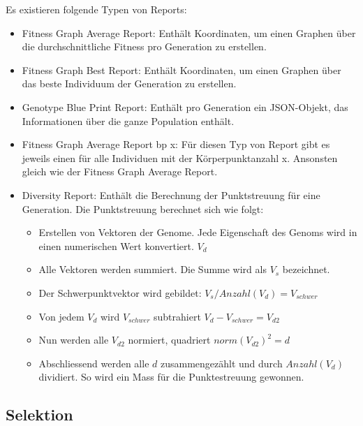       \medskip

      Es existieren folgende Typen von Reports:

      \begin{itemize}

        \item Fitness Graph Average Report: Enthält Koordinaten,
          um einen Graphen über die durchschnittliche Fitness pro Generation zu erstellen.

        \item Fitness Graph Best Report: Enthält Koordinaten,
          um einen Graphen über das beste Individuum der Generation zu erstellen.

        \item Genotype Blue Print Report: Enthält pro Generation ein \gls{JSON}-Objekt,
          das Informationen über die ganze Population enthält.

        \item Fitness Graph Average Report bp x: Für diesen Typ von Report gibt es jeweils einen für alle Individuen mit der Körperpunktanzahl x.
              Ansonsten gleich wie der Fitness Graph Average Report.

        \item Diversity Report: Enthält die Berechnung der Punktstreuung für eine Generation.
          Die Punktstreuung berechnet sich wie folgt:

        \begin{itemize}
          \item Erstellen von Vektoren der Genome. Jede Eigenschaft des Genoms wird in einen numerischen Wert konvertiert. \( V_d \)
          \item Alle Vektoren werden summiert. Die Summe wird als \(V_s\) bezeichnet.
          \item Der Schwerpunktvektor wird gebildet: \( V_s / Anzahl(V_d) = V_{schwer} \)
          \item Von jedem \(V_d\) wird \(V_{schwer}\) subtrahiert  \( V_d - V_{schwer}  = V_{d2} \)
          \item Nun werden alle \(V_{d2}\) normiert, quadriert \( norm{(V_{d2})}^2 = d \)
          \item Abschliessend werden alle \(d\) zusammengezählt und durch \(Anzahl(V_d)\) dividiert. So wird ein Mass für die Punktestreuung gewonnen.
        \end{itemize}
      \end{itemize}

    \subsection{Selektion\label{sec:Selektion}}

